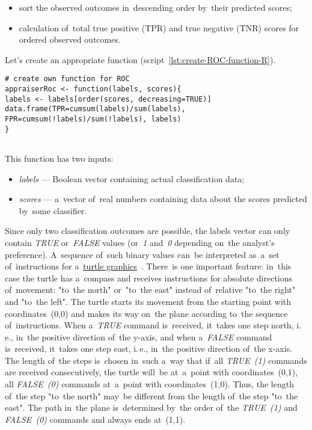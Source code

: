 \documentclass[]{scrreprt}
\begin{document}
\begin{itemize}
	\item sort the observed outcomes in~descending order by~their predicted scores;
	\item calculation of~total true positive (TPR) and true negative (TNR) scores for ordered observed outcomes.
\end{itemize}
Let's create an appropriate function (script~\ref{lst:create-ROC-function-R}).
%
\begin{lstlisting}[float, caption = Creating a~function to~calculate TPR and FPR, firstnumber=1, label= lst:create-ROC-function-R]
# create own function for ROC
appraiserRoc <- function(labels, scores){
labels <- labels[order(scores, decreasing=TRUE)]
data.frame(TPR=cumsum(labels)/sum(labels),
FPR=cumsum(!labels)/sum(!labels), labels)
}
 
\end{lstlisting}
%
This function has two inputs:
\begin{itemize}
	\item \emph{labels} --- Boolean vector containing actual classification data;
	\item \emph{scores} --- a~vector of~real numbers containing data about the scores predicted by~some classifier.
\end{itemize}
%
Since only two classification outcomes are possible, the labels vector can only contain \emph{TRUE} or~\emph{FALSE} values (or~\emph{1} and~\emph{0} depending on~the analyst's preference). A~sequence of~such binary values can~be interpreted as~a~set of~instructions for a~\href{https://en.wikipedia.org/wiki/Turtle_graphics}{turtle graphics}~\cite{Wiki:turtle-graphics}. There~is one important feature: in~this case the turtle has a~compass and receives instructions for absolute directions of~movement: "to~the north" or~"to~the east" instead of~relative "to~the right" and "to~the left". The turtle starts its movement from the starting point with coordinates~(0,0) and makes its way on~the plane according to~the sequence of~instructions. When a~\emph{TRUE} command is~received, it~takes one step north, i.\,e., in~the positive direction of~the y-axis, and when a~\emph{FALSE} command is~received, it~takes one step east, i.\,e., in~the positive direction of~the x-axis. The length of~the steps is~chosen in~such a~way that if~all \emph{TRUE~(1)} commands are received consecutively, the turtle will~be at~a~point with coordinates~(0,1), all \emph{FALSE~(0)} commands at~a~point with coordinates~(1,0). Thus, the length of~the step "to~the north" may~be different from the length of~the step "to~the east". The path in~the plane is~determined by~the order of~the \emph{TRUE~(1)} and \emph{FALSE~(0)} commands and always ends at~(1,1).
\end{document}
